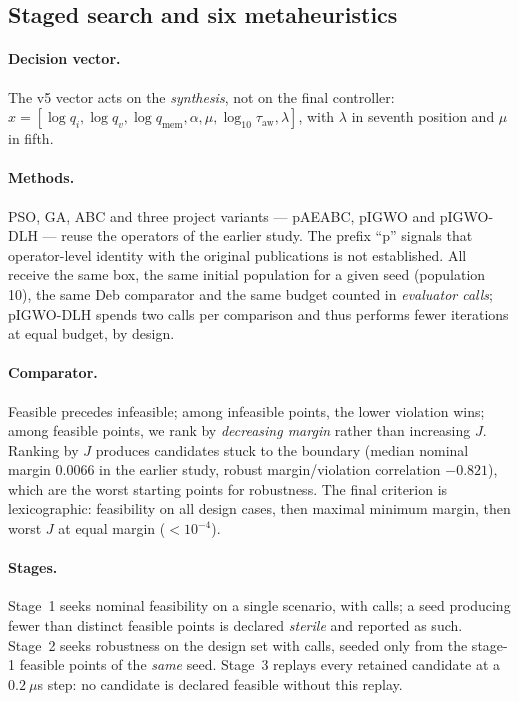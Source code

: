 \subsection{Staged search and six metaheuristics}

\paragraph{Decision vector.}
The v5 vector acts on the \emph{synthesis}, not on the final controller:
$x=[\log q_i,\log q_v,\log q_\mathrm{mem},\alpha,\mu,\log_{10}\tau_\mathrm{aw},\lambda]$,
with $\lambda$ in seventh position and $\mu$ in fifth.

\paragraph{Methods.}
PSO, GA, ABC and three project variants --- pAEABC, pIGWO and pIGWO-DLH ---
reuse the operators of the earlier study. The prefix ``p'' signals that
operator-level identity with the original publications is not established.
All receive the same box, the same initial population for a given seed
(population 10), the same Deb comparator and the same budget counted in
\emph{evaluator calls}; pIGWO-DLH spends two calls per comparison and thus
performs fewer iterations at equal budget, by design.

\paragraph{Comparator.}
Feasible precedes infeasible; among infeasible points, the lower violation
wins; among feasible points, we rank by \emph{decreasing margin} rather than
increasing $J$. Ranking by $J$ produces candidates stuck to the boundary
(median nominal margin $0.0066$ in the earlier study, robust margin/violation
correlation $-0.821$), which are the worst starting points for robustness.
The final criterion is lexicographic: feasibility on all design cases, then
maximal minimum margin, then worst $J$ at equal margin ($<10^{-4}$).

\paragraph{Stages.}
Stage~1 seeks nominal feasibility on a single scenario, with
\ChiffreBudgetUn{} calls; a seed producing fewer than \ChiffreMinFaisables{}
distinct feasible points is declared \emph{sterile} and reported as such.
Stage~2 seeks robustness on the design set with \ChiffreBudgetDeux{} calls,
seeded only from the stage-1 feasible points of the \emph{same} seed.
Stage~3 replays every retained candidate at a $0.2~\mu$s step: no candidate is
declared feasible without this replay.

